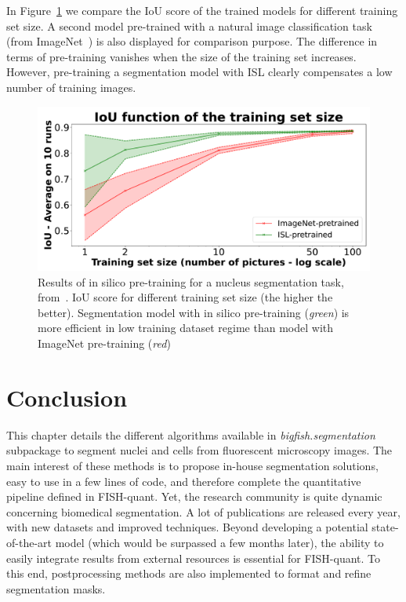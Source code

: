 In Figure~\ref{fig:results_insilico} we compare the \ac{IoU} score of the trained models for different training set size.
A second model pre-trained with a natural image classification task (from ImageNet~\cite{Deng_2009}) is also displayed for comparison purpose.
The difference in terms of pre-training vanishes when the size of the training set increases.
However, pre-training a segmentation model with \ac{ISL} clearly compensates a low number of training images.

\begin{figure}[]
    \centering
    \includegraphics[width=\textwidth]{figures/chapter3/insilico_training_size}
    \caption[Results of in silico pre-training]{Results of in silico pre-training for a nucleus segmentation task, from~\cite{Bonte_2022}.
	IoU score for different training set size (the higher the better).
	Segmentation model with in silico pre-training (\textit{green}) is more efficient in low training dataset regime than model with ImageNet pre-training (\textit{red})}
    \label{fig:results_insilico}
\end{figure}

\section{Conclusion}
\label{sec:segmentation_conclusion}

This chapter details the different algorithms available in \emph{bigfish.segmentation} subpackage to segment nuclei and cells from fluorescent microscopy images.
The main interest of these methods is to propose in-house segmentation solutions, easy to use in a few lines of code, and therefore complete the quantitative pipeline defined in FISH-quant.
Yet, the research community is quite dynamic concerning biomedical segmentation.
A lot of publications are released every year, with new datasets and improved techniques.
Beyond developing a potential state-of-the-art model (which would be surpassed a few months later), the ability to easily integrate results from external resources is essential for FISH-quant.
To this end, postprocessing methods are also implemented to format and refine segmentation masks.

